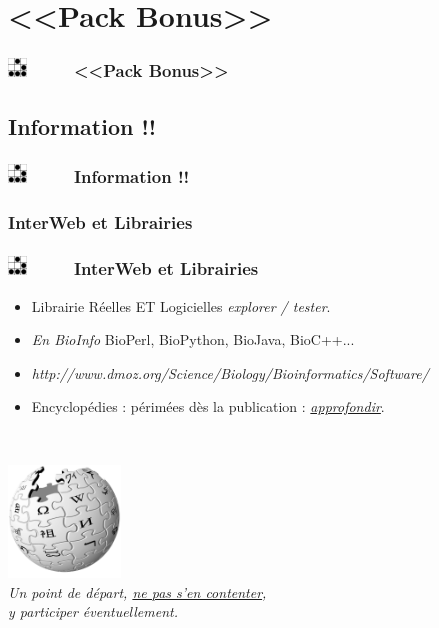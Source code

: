 \documentclass[slidetop,11pt]{beamer}
\def\sectionPartIII{<<Pack Bonus>>}
\def\sectionPartIIIa{Information !!}
\def\sectionPartIIIaUN{InterWeb et Librairies}
\def\moreInFrameTitle{\includegraphics[height=0.5cm]{img/logo_glider.png}~~~~~}
\begin{document}
\section{\sectionPartIII}
\begin{frame}
	\frametitle{\moreInFrameTitle \sectionPartIII}
	\tableofcontents[sections=3,subsectionstyle=shaded/shaded/shaded]
\end{frame} 

\subsection{\sectionPartIIIa}
\begin{frame}
	\frametitle{\moreInFrameTitle \sectionPartIIIa}
	\tableofcontents[sections=3,subsectionstyle=show/shaded/hide]
\end{frame} 

\subsubsection{\sectionPartIIIaUN}
\begin{frame}
	\frametitle{\moreInFrameTitle \sectionPartIIIaUN}
	\begin{itemize}
		\item Librairie R{\'e}elles ET Logicielles \emph{explorer / tester}.  
		\item \emph{En BioInfo} BioPerl, BioPython, BioJava, BioC++...
		\item {\footnotesize \emph{http://www.dmoz.org/Science/Biology/Bioinformatics/Software/} }
		\item Encyclop{\'e}dies : p{\'e}rim{\'e}es d{\`e}s la publication : \underline{\emph{approfondir}}. 
	\end{itemize}~\\
	\begin{center}
	\includegraphics[width=3cm]{img/logo_wikipedia.png}~\\ 
	\emph{Un point de d{\'e}part, \underline{ne pas s'en contenter},~\\ y participer {\'e}ventuellement. }
	\end{center}
\end{frame} 
\end{document}
